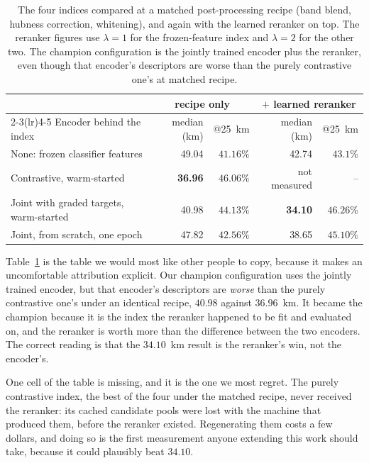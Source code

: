 \documentclass[11pt,a4paper]{article}
\begin{document}
\begin{table}[t]
\centering
\small
\begin{tabular}{lrrrr}
\toprule
& \multicolumn{2}{c}{recipe only} & \multicolumn{2}{c}{$+$ learned reranker} \\
\cmidrule(lr){2-3}\cmidrule(lr){4-5}
Encoder behind the index & median (km) & @25~km & median (km) & @25~km \\
\midrule
None: frozen classifier features & 49.04 & $41.16\%$ & 42.74 & $43.1\%$ \\
Contrastive, warm-started & \textbf{36.96} & $\mathbf{46.06\%}$ & not measured & -- \\
Joint with graded targets, warm-started & 40.98 & $44.13\%$ & \textbf{34.10} & $\mathbf{46.26\%}$ \\
Joint, from scratch, one epoch & 47.82 & $42.56\%$ & 38.65 & $45.10\%$ \\
\bottomrule
\end{tabular}
\caption{The four indices compared at a matched post-processing recipe (band blend, hubness
correction, whitening), and again with the learned reranker on top. The reranker figures use
$\lambda = 1$ for the frozen-feature index and $\lambda = 2$ for the other two. The champion
configuration is the jointly trained encoder plus the reranker, even though that encoder's
descriptors are worse than the purely contrastive one's at matched recipe.}
\label{tab:encoders}
\end{table}

Table~\ref{tab:encoders} is the table we would most like other people to copy, because it makes an
uncomfortable attribution explicit. Our champion configuration uses the jointly trained
encoder, but that encoder's descriptors are \emph{worse} than the purely contrastive one's
under an identical recipe, $40.98$ against $36.96$~km. It became the champion because it is
the index the reranker happened to be fit and evaluated on, and the reranker is worth more
than the difference between the two encoders. The correct reading is that the $34.10$~km
result is the reranker's win, not the encoder's.

One cell of the table is missing, and it is the one we most regret. The purely contrastive
index, the best of the four under the matched recipe, never received the reranker: its
cached candidate pools were lost with the machine that produced them, before the reranker
existed. Regenerating them costs a few dollars, and doing so is the first measurement anyone
extending this work should take, because it could plausibly beat $34.10$.
\end{document}
